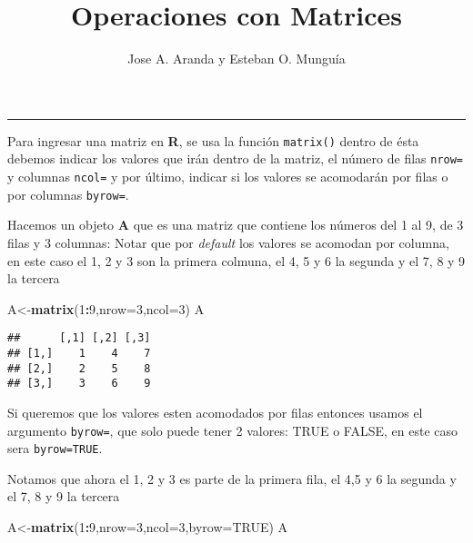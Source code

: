 \documentclass[
]{article}
\title{Operaciones con Matrices}
\author{Jose A. Aranda y Esteban O. Munguía}
\date{}
\newenvironment{Shaded}{\begin{snugshade}}{\end{snugshade}}
\newcommand{\DataTypeTok}[1]{\textcolor[rgb]{0.13,0.29,0.53}{#1}}
\newcommand{\DecValTok}[1]{\textcolor[rgb]{0.00,0.00,0.81}{#1}}
\newcommand{\KeywordTok}[1]{\textcolor[rgb]{0.13,0.29,0.53}{\textbf{#1}}}
\newcommand{\NormalTok}[1]{#1}
\newcommand{\OperatorTok}[1]{\textcolor[rgb]{0.81,0.36,0.00}{\textbf{#1}}}
\newcommand{\OtherTok}[1]{\textcolor[rgb]{0.56,0.35,0.01}{#1}}
\begin{document}
\maketitle

\begin{center}\rule{0.5\linewidth}{0.5pt}\end{center}

Para ingresar una matriz en \textbf{R}, se usa la función
\texttt{matrix()} dentro de ésta debemos indicar los valores que irán
dentro de la matriz, el número de filas \texttt{nrow=} y columnas
\texttt{ncol=} y por último, indicar si los valores se acomodarán por
filas o por columnas \texttt{byrow=}.

Hacemos un objeto \textbf{A} que es una matriz que contiene los números
del 1 al 9, de 3 filas y 3 columnas: Notar que por \emph{default} los
valores se acomodan por columna, en este caso el 1, 2 y 3 son la primera
colmuna, el 4, 5 y 6 la segunda y el 7, 8 y 9 la tercera

\begin{Shaded}
\begin{Highlighting}[]
\NormalTok{A\textless{}{-}}\KeywordTok{matrix}\NormalTok{(}\DecValTok{1}\OperatorTok{:}\DecValTok{9}\NormalTok{,}\DataTypeTok{nrow=}\DecValTok{3}\NormalTok{,}\DataTypeTok{ncol=}\DecValTok{3}\NormalTok{)}
\NormalTok{A}
\end{Highlighting}
\end{Shaded}

\begin{verbatim}
##      [,1] [,2] [,3]
## [1,]    1    4    7
## [2,]    2    5    8
## [3,]    3    6    9
\end{verbatim}

Si queremos que los valores esten acomodados por filas entonces usamos
el argumento \texttt{byrow=}, que solo puede tener 2 valores: TRUE o
FALSE, en este caso sera \texttt{byrow=TRUE}.

Notamos que ahora el 1, 2 y 3 es parte de la primera fila, el 4,5 y 6 la
segunda y el 7, 8 y 9 la tercera

\begin{Shaded}
\begin{Highlighting}[]
\NormalTok{A\textless{}{-}}\KeywordTok{matrix}\NormalTok{(}\DecValTok{1}\OperatorTok{:}\DecValTok{9}\NormalTok{,}\DataTypeTok{nrow=}\DecValTok{3}\NormalTok{,}\DataTypeTok{ncol=}\DecValTok{3}\NormalTok{,}\DataTypeTok{byrow=}\OtherTok{TRUE}\NormalTok{)}
\NormalTok{A}
\end{Highlighting}
\end{Shaded}
\end{document}
